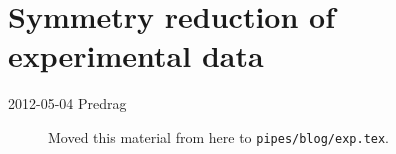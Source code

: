 
\chapter{Symmetry reduction of experimental data}
\label{c-exp}


\begin{description}

\item[2012-05-04 Predrag] Moved this material from here to
\texttt{pipes/blog/exp.tex}.

\end{description}
